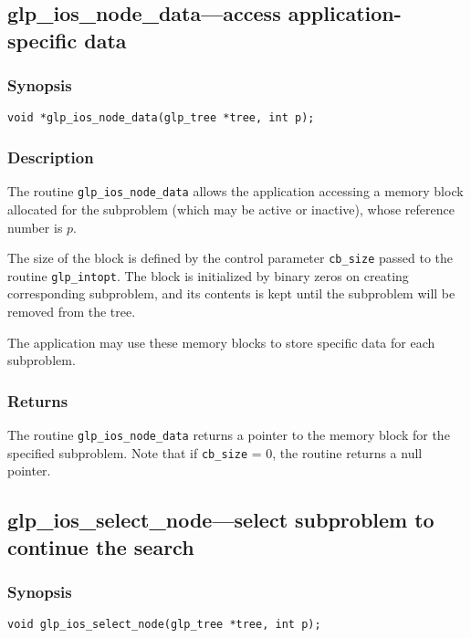 \subsection{glp\_ios\_node\_data---access application-specific data}

\subsubsection*{Synopsis}

\begin{verbatim}
void *glp_ios_node_data(glp_tree *tree, int p);
\end{verbatim}

\subsubsection*{Description}

The routine \verb|glp_ios_node_data| allows the application accessing a
memory block allocated for the subproblem (which may be active or
inactive), whose reference number is $p$.

The size of the block is defined by the control parameter \verb|cb_size|
passed to the routine \verb|glp_intopt|. The block is initialized by
binary zeros on creating corresponding subproblem, and its contents is
kept until the subproblem will be removed from the tree.

The application may use these memory blocks to store specific data for
each subproblem.

\subsubsection*{Returns}

The routine \verb|glp_ios_node_data| returns a pointer to the memory
block for the specified subproblem. Note that if \verb|cb_size| = 0, the
routine returns a null pointer.

\subsection{glp\_ios\_select\_node---select subproblem to continue the
search}

\subsubsection*{Synopsis}

\begin{verbatim}
void glp_ios_select_node(glp_tree *tree, int p);
\end{verbatim}

